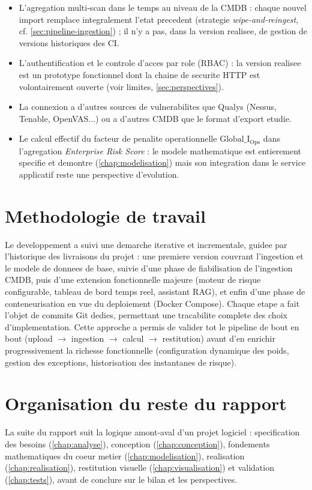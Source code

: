 \begin{itemize}
  \item L'agregation multi-scan dans le temps au niveau de la CMDB : chaque nouvel
  import remplace integralement l'etat precedent (strategie \emph{wipe-and-reingest},
  cf. \cref{sec:pipeline-ingestion}) ; il n'y a pas, dans la version realisee, de
  gestion de versions historiques des CI.
  \item L'authentification et le controle d'acces par role (RBAC) : la version
  realisee est un prototype fonctionnel dont la chaine de securite HTTP est
  volontairement ouverte (voir limites, \cref{sec:perspectives}).
  \item La connexion a d'autres sources de vulnerabilites que Qualys (Nessus,
  Tenable, OpenVAS...) ou a d'autres CMDB que le format d'export etudie.
  \item Le calcul effectif du facteur de penalite operationnelle
  $\mathrm{Global\_I_{Ops}}$ dans l'agregation \emph{Enterprise Risk Score} : le
  modele mathematique est entierement specifie et demontre (\cref{chap:modelisation})
  mais son integration dans le service applicatif reste une perspective
  d'evolution.
\end{itemize}

\section{Methodologie de travail}

Le developpement a suivi une demarche iterative et incrementale, guidee par
l'historique des livraisons du projet : une premiere version couvrant l'ingestion et
le modele de donnees de base, suivie d'une phase de fiabilisation de l'ingestion
CMDB, puis d'une extension fonctionnelle majeure (moteur de risque configurable,
tableau de bord temps reel, assistant RAG), et enfin d'une phase de
conteneurisation en vue du deploiement (Docker Compose). Chaque etape a fait l'objet
de commits Git dedies, permettant une tracabilite complete des choix
d'implementation. Cette approche a permis de valider tot le pipeline de bout en
bout (upload $\to$ ingestion $\to$ calcul $\to$ restitution) avant d'en enrichir
progressivement la richesse fonctionnelle (configuration dynamique des poids,
gestion des exceptions, historisation des instantanes de risque).

\section{Organisation du reste du rapport}

La suite du rapport suit la logique amont-aval d'un projet logiciel : specification
des besoins (\cref{chap:analyse}), conception (\cref{chap:conception}), fondements
mathematiques du coeur metier (\cref{chap:modelisation}), realisation
(\cref{chap:realisation}), restitution visuelle (\cref{chap:visualisation}) et
validation (\cref{chap:tests}), avant de conclure sur le bilan et les perspectives.
